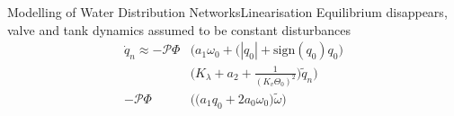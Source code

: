 \begin{frame}{Modelling of Water Distribution Networks}{Linearisation}
	Equilibrium disappears, valve and tank dynamics assumed to be constant disturbances 
	\begin{equation}\label{eq:SymbolicLinearisationSimplified}
		\begin{split}
			\dot{q}_n \approx -\mathcal{P}\Phi &\Bigg(a_1\omega_0 + \Big(|q_0|+\text{sign}(q_0)q_0\Big) \\
			&\Bigg(K_\lambda + a_2 + \frac{1}{(K_v \Theta_0)^2}\Bigg) \tilde{q}_n \Bigg) \\
			- \mathcal{P}\Phi&\Bigg(\Big(a_1 q_0 + 2a_0\omega_0\Big) \tilde{\omega}\Bigg)
		\end{split}
	\end{equation}
	
\end{frame}
